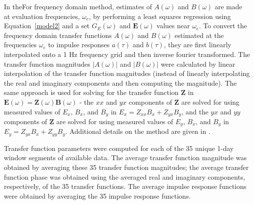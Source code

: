 \documentclass[draft,linenumbers]{agujournal2018}
\begin{document}
In theFor frequency domain method, estimates of $A(\omega)$ and $B(\omega)$ are made at evaluation frequencies, $\omega_e$, by performing a least squares regression using Equation~\ref{model2} and a set $G_E(\omega)$ and $\mathbf{E}(\omega)$ values near $\omega_e$. To convert the frequency domain transfer functions $A(\omega)$ and $B(\omega)$ estimated at the frequencies $\omega_e$ to impulse responses $a(\tau)$ and $b(\tau)$, they are first linearly interpolated onto a 1 Hz frequency grid and then inverse fourier transformed. The transfer function magnitudes $|A(\omega)|$ and $|B(\omega)|$ were calculated by linear interpolation of the transfer function magnitudes (instead of linearly interpolating the real and imaginary components and then computing the magnitude). The same approach is used for solving for the transfer function $\mathbf{Z}$ in $\mathbf{E}(\omega) = \mathbf{Z}(\omega)\mathbf{B}(\omega)$ - the $xx$ and $yx$ components of $\mathbf{Z}$ are solved for using measured values of $E_x$, $B_x$, and $B_y$ in $E_x = Z_{xx}B_x + Z_{yx}B_{y}$, and the $yx$ and $yy$ components of $\mathbf{Z}$ are solved for using measured values of $E_y$, $B_x$, and $B_y$ in $E_y = Z_{yx}B_x + Z_{yy}B_y$. Additional details on the method are given in \cite[][{Weigel2017} and references therein.]{Weigel2017}.



Transfer function parameters were computed for each of the 35 unique 1-day window segments of available data. The average transfer function magnitude was obtained by averaging these 35 transfer function magnitudes; the average transfer function phase was obtained using the averaged real and imaginary components, respectively, of the 35 transfer functions. The average impulse response functions were obtained by averaging the 35 impulse response functions. 
\end{document}

